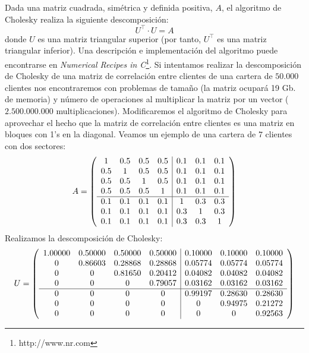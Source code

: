 Dada una matriz cuadrada, sim\'etrica y definida positiva, $A$, el algoritmo
de Cholesky realiza la siguiente descomposici\'on:
\begin{displaymath}
U^{\top} \cdot U = A
\end{displaymath}
donde $U$ es una matriz triangular superior (por tanto, $U^{\top}$ es una matriz
triangular inferior). Una descripci\'on e implementaci\'on del algoritmo puede
encontrarse en \emph{Numerical Recipes in C}\footnote{http://www.nr.com}.
\newline
\newline
Si intentamos realizar la descomposici\'on de Cholesky de una matriz de correlaci\'on
entre clientes de una cartera de $50.000$ clientes nos encontraremos con problemas
de tama\~no (la matriz ocupar\'a 19 Gb. de memoria) y n\'umero de operaciones al
multiplicar la matriz por un vector ($2.500.000.000$ multiplicaciones).
\newline
\newline
Modificaremos el algoritmo de Cholesky para aprovechar el hecho que la matriz
de correlaci\'on entre clientes es una matriz en bloques con 1's en la diagonal.
Veamos un ejemplo de una cartera de $7$ clientes con dos sectores:
\begin{displaymath}
A = \left(
\begin{array}{cccc|ccc}
1   & 0.5 & 0.5 & 0.5 & 0.1 & 0.1 & 0.1 \cr
0.5 & 1   & 0.5 & 0.5 & 0.1 & 0.1 & 0.1 \cr
0.5 & 0.5 & 1   & 0.5 & 0.1 & 0.1 & 0.1 \cr
0.5 & 0.5 & 0.5 & 1   & 0.1 & 0.1 & 0.1 \cr
\hline
0.1 & 0.1 & 0.1 & 0.1 & 1   & 0.3 & 0.3 \cr
0.1 & 0.1 & 0.1 & 0.1 & 0.3 & 1   & 0.3 \cr
0.1 & 0.1 & 0.1 & 0.1 & 0.3 & 0.3 & 1
\end{array}
\right)
\end{displaymath}
Realizamos la descomposici\'on de Cholesky:
\begin{displaymath}
U = \left(
\begin{array}{cccc|ccc}
 1.00000 & 0.50000 & 0.50000 & 0.50000 & 0.10000 & 0.10000 & 0.10000 \cr
 0       & 0.86603 & 0.28868 & 0.28868 & 0.05774 & 0.05774 & 0.05774 \cr
 0       & 0       & 0.81650 & 0.20412 & 0.04082 & 0.04082 & 0.04082 \cr
 0       & 0       & 0       & 0.79057 & 0.03162 & 0.03162 & 0.03162 \cr
\hline
 0       & 0       & 0       & 0       & 0.99197 & 0.28630 & 0.28630 \cr
 0       & 0       & 0       & 0       & 0       & 0.94975 & 0.21272 \cr
 0       & 0       & 0       & 0       & 0       & 0       & 0.92563
\end{array}
\right)
\end{displaymath}
